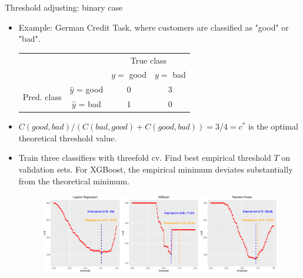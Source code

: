 \documentclass[11pt,compress,t,notes=noshow, xcolor=table]{beamer}
\begin{document}
\begin{vbframe}{Threshold adjusting: binary case}
    \footnotesize 
    \begin{itemize}
        \scriptsize
        \item Example: German Credit Task, where customers are classified as "good" or "bad".
        \begin{center}
                            \begin{tabular}{cc|cc}
        			& &\multicolumn{2}{c}{True class} \\
        			& & $y=$ good & $y=$ bad  \\
        			\hline
        			\multirow{2}{*}{\parbox{0.3cm}{Pred.  class}} & $\hat y$ = good & 0 & 3 \\
        			& $\hat y$ = bad & 1 & 0\\
                \end{tabular}
        \end{center}
        \item $C(good,bad)/(C(bad,good)+C(good,bad))=3/4=c^{*}$ is the optimal theoretical threshold value.

        \item Train three classifiers with threefold cv. Find best empirical threshold $T$ on validation sets. For XGBoost, the empirical minimum deviates substantially from the theoretical minimum.

                \begin{figure}[h]
            \centering
            \includegraphics[width=1\textwidth]{slides/imbalanced-learning/figure_man/threshold_plots.pdf}
        \end{figure}

    \end{itemize}
\end{vbframe}
\end{document}
